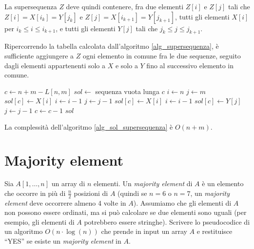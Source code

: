 La supersequenza $Z$ deve quindi contenere, fra due elementi $Z[i]$ e $Z[j]$ tali che $Z[i] = X[i_{k}] = Y[j_{k}]$ e $Z[j] = X[i_{k+1}] = Y[j_{k+1}]$, tutti gli elementi $X[i]$ per $i_k \le i \le i_{k+1}$, e tutti gli elementi $Y[j]$ tali che $j_k \le j \le j_{k+1}$.

Ripercorrendo la tabella calcolata dall'algoritmo \ref{alg_supersequenza}, \`e sufficiente aggiungere a $Z$ ogni elemento in comune fra le due sequenze, seguito dagli elementi appartenenti solo a $X$ e solo a $Y$ fino al successivo elemento in comune.

\begin{algorithm}
\begin{algorithmic}
    \State $c \gets n + m - L[n,m]$
    \State $sol \gets$ sequenza vuota lunga $c$
    \State $i \gets n$
    \State $j \gets m$
            \State $sol[c] \gets X[i]$
            \State $i \gets i - 1$
            \State $j \gets j - 1$
            \State $sol[c] \gets X[i]$
            \State $i \gets i - 1$
        \Else
            \State $sol[c] \gets Y[j]$
            \State $j \gets j - 1$
        \EndIf
        \State $c \gets c - 1$
    \EndWhile
    \State \Return $sol$
\EndFunction
\end{algorithmic}
\caption{\label{alg_sol_supersequenza}trovare una supersequenza di lunghezza minima}
\end{algorithm}

La complessit\`a dell'algoritmo \ref{alg_sol_supersequenza} \`e $O(n + m)$.

\clearpage

\section{Majority element}

\begin{esercizio}
Sia $A[1,\ldots,n]$ un array di $n$ elementi. Un \emph{majority element} di $A$ \`e un elemento che occorre in pi\`u di $\frac{n}{2}$ posizioni di $A$ (quindi se $n = 6$ o $n = 7$, un \emph{majority element} deve occorrere almeno 4  volte in $A$). Assumiamo che gli elementi di $A$ non possono essere ordinati, ma si pu\`o calcolare se due elementi sono uguali (per esempio, gli elementi di $A$ potrebbero essere stringhe). Scrivere lo pseudocodice di un algoritmo $O \left(n \cdot \log (n) \right)$ che prende in input un array $A$ e restituisce ``YES'' se esiste un \emph{majority element} in $A$.
\end{esercizio}

